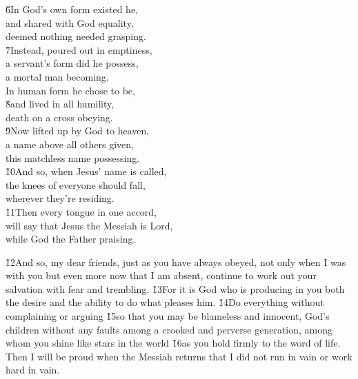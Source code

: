 \begin{poetry}
\poeml \v{6}In God's own form existed he, \\
\poemll    and shared with God equality, \\
\poemlll       deemed nothing needed grasping. \\
\poeml \v{7}Instead, poured out in emptiness, \\
\poemll    a servant's form did he possess, \\
\poemlll       a mortal man becoming. \\
\poeml In human form he chose to be, \\
\poeml \v{8}and lived in all humility, \\
\poemlll       death on a cross obeying. \\
\poeml \v{9}Now lifted up by God to heaven, \\
\poemll    a name above all others given, \\
\poemlll       this matchless name possessing. \\
\poeml \v{10}And so, when Jesus' name is called, \\
\poemll    the knees of everyone should fall, \\
\poemlll       wherever they're residing. \\
\poeml \v{11}Then every tongue in one accord, \\
\poemll    will say that Jesus the Messiah is Lord, \\
\poemlll       while God the Father praising.
\end{poetry}

\v{12}And so, my dear friends, just as you have always obeyed, not only when I was with you but even more now that I am absent, continue to work out your salvation with fear and trembling. \v{13}For it is God who is producing in you both the desire and the ability to do what pleases him. \v{14}Do everything without complaining or arguing \v{15}so that you may be blameless and innocent, God's children without any faults among a crooked and perverse generation, among whom you shine like stars in the world \v{16}as you hold firmly to the word of life. Then I will be proud when the Messiah returns that I did not run in vain or work hard in vain.

